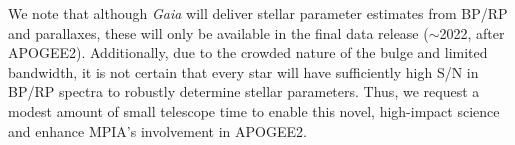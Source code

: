 \documentclass[a4paper]{article}
\begin{document}
\begin{ObservingProgram}
We note that although \textit{Gaia} will deliver stellar parameter estimates from BP/RP and parallaxes, these will only be available in the final data release ($\sim$2022, after APOGEE2). Additionally, due to the crowded nature of the bulge and limited bandwidth, it is not certain that every star will have sufficiently high S/N in BP/RP spectra to robustly determine stellar parameters.  Thus, we request a modest amount of small telescope time to enable this novel, high-impact science and enhance MPIA's involvement in APOGEE2.

\end{ObservingProgram}
%
%
%
%
%
\end{document}
